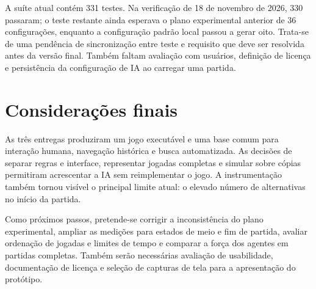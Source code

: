 \documentclass[12pt]{article}
\begin{document}
A suíte atual contém 331 testes. Na verificação de 18 de novembro de 2026, 330 passaram; o teste restante ainda esperava o plano experimental anterior de 36 configurações, enquanto a configuração padrão local passou a gerar oito. Trata-se de uma pendência de sincronização entre teste e requisito que deve ser resolvida antes da versão final. Também faltam avaliação com usuários, definição de licença e persistência da configuração de IA ao carregar uma partida.


\section{Considerações finais}

As três entregas produziram um jogo executável e uma base comum para interação humana, navegação histórica e busca automatizada. As decisões de separar regras e interface, representar jogadas completas e simular sobre cópias permitiram acrescentar a IA sem reimplementar o jogo. A instrumentação também tornou visível o principal limite atual: o elevado número de alternativas no início da partida.

Como próximos passos, pretende-se corrigir a inconsistência do plano experimental, ampliar as medições para estados de meio e fim de partida, avaliar ordenação de jogadas e limites de tempo e comparar a força dos agentes em partidas completas. Também serão necessárias avaliação de usabilidade, documentação de licença e seleção de capturas de tela para a apresentação do protótipo.




\end{document}
